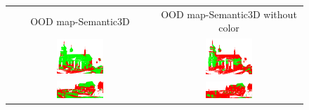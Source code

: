     \begin{figure}[h!]
        \centering
        \begin{tabular}{cc}
            OOD map-Semantic3D & OOD map-Semantic3D without color \\
            \includegraphics[width=0.33\textwidth, height=0.18\textheight]{images/ood_imgs/sem3d_of/ent/fout_sem3d_OOD_1.pdf}&
            \includegraphics[width=0.33\textwidth, height=0.18\textheight]{images/ood_imgs/sem3d_of/ent/fout_sem3d_of_OOD_1.pdf}\\

            \includegraphics[width=0.33\textwidth, height=0.18\textheight]{images/ood_imgs/sem3d_of/ent/fout_sem3d_OOD_2.pdf}&
            \includegraphics[width=0.33\textwidth, height=0.18\textheight]{images/ood_imgs/sem3d_of/ent/fout_sem3d_of_OOD_2.pdf}\\


\end{tabular}
\end{figure}
